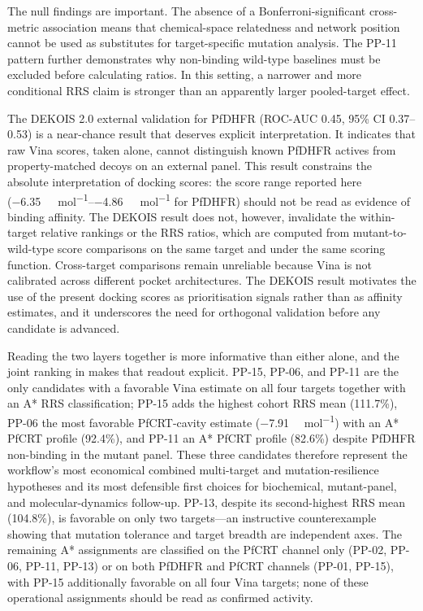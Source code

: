 \documentclass[journal=jcisd8,manuscript=article]{achemso}
\begin{document}
The null findings are important. The absence of a Bonferroni-significant cross-metric association means that chemical-space relatedness and network position cannot be used as substitutes for target-specific mutation analysis. The PP-11 pattern further demonstrates why non-binding wild-type baselines must be excluded before calculating ratios. In this setting, a narrower and more conditional RRS claim is stronger than an apparently larger pooled-target effect.

The DEKOIS 2.0 external validation for PfDHFR (ROC-AUC 0.45, 95\% CI 0.37--0.53) is a near-chance result that deserves explicit interpretation. It indicates that raw Vina scores, taken alone, cannot distinguish known PfDHFR actives from property-matched decoys on an external panel. This result constrains the absolute interpretation of docking scores: the score range reported here (\qtyrange{-6.35}{-4.86}{\kilo\calorie\per\mole} for PfDHFR) should not be read as evidence of binding affinity. The DEKOIS result does not, however, invalidate the within-target relative rankings or the RRS ratios, which are computed from mutant-to-wild-type score comparisons on the same target and under the same scoring function. Cross-target comparisons remain unreliable because Vina is not calibrated across different pocket architectures. The DEKOIS result motivates the use of the present docking scores as prioritisation signals rather than as affinity estimates, and it underscores the need for orthogonal validation before any candidate is advanced.

Reading the two layers together is more informative than either alone, and the joint ranking in  makes that readout explicit. PP-15, PP-06, and PP-11 are the only candidates with a favorable Vina estimate on all four targets together with an A* RRS classification; PP-15 adds the highest cohort RRS mean (\num{111.7}\%), PP-06 the most favorable PfCRT-cavity estimate (\num{-7.91} \si{\kilo\calorie\per\mole}) with an A* PfCRT profile (\num{92.4}\%), and PP-11 an A* PfCRT profile (\num{82.6}\%) despite PfDHFR non-binding in the mutant panel. These three candidates therefore represent the workflow's most economical combined multi-target and mutation-resilience hypotheses and its most defensible first choices for biochemical, mutant-panel, and molecular-dynamics follow-up. PP-13, despite its second-highest RRS mean (\num{104.8}\%), is favorable on only two targets—an instructive counterexample showing that mutation tolerance and target breadth are independent axes. The remaining A* assignments are classified on the PfCRT channel only (PP-02, PP-06, PP-11, PP-13) or on both PfDHFR and PfCRT channels (PP-01, PP-15), with PP-15 additionally favorable on all four Vina targets; none of these operational assignments should be read as confirmed activity.
\end{document}

